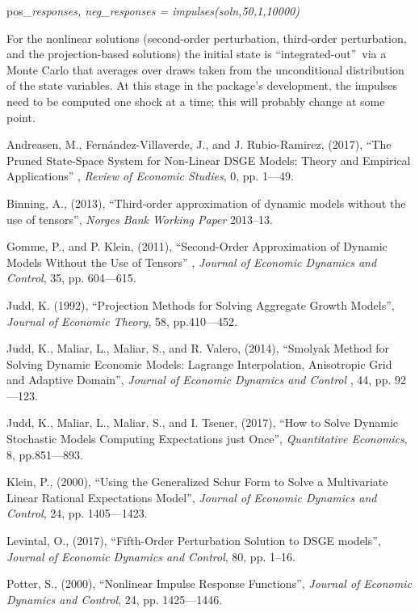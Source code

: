 \documentclass[notitlepage,11pt]{article}
\begin{document}
pos\_\textit{responses, neg\_responses = impulses(soln,50,1,10000)}

\bigskip

For the nonlinear solutions (second-order perturbation, third-order
perturbation, and the projection-based solutions) the initial state is
\textquotedblleft integrated-out\textquotedblright\ via a Monte Carlo that
averages over draws taken from the unconditional distribution of the state
variables. At this stage in the package's development, the impulses need to
be computed one shock at a time; this will probably change at some point.

\begin{thebibliography}{9}
\bibitem{} Andreasen, M., Fern\'{a}ndez-Villaverde, J., and J.
Rubio-Ramirez, (2017), \textquotedblleft The Pruned State-Space System for
Non-Linear DSGE Models: Theory and Empirical Applications\textquotedblright
, \textit{Review of Economic Studies}, 0, pp. 1---49.

\bibitem{} Binning, A., (2013), \textquotedblleft Third-order approximation
of dynamic models without the use of tensors\textquotedblright , \textit{%
Norges Bank Working Paper} 2013--13.

\bibitem{} Gomme, P., and P. Klein, (2011), \textquotedblleft Second-Order
Approximation of Dynamic Models Without the Use of Tensors\textquotedblright
, \textit{Journal of Economic Dynamics and Control}, 35, pp. 604---615.

\bibitem{} Judd, K. (1992), \textquotedblleft Projection Methods for Solving
Aggregate Growth Models\textquotedblright , \textit{Journal of Economic
Theory}, 58, pp.410---452.

\bibitem{} Judd, K., Maliar, L., Maliar, S., and R. Valero, (2014),
\textquotedblleft Smolyak Method for Solving Dynamic Economic Models:
Lagrange Interpolation, Anisotropic Grid and Adaptive
Domain\textquotedblright , \textit{Journal of Economic Dynamics and Control}%
, 44, pp. 92---123.

\bibitem{} Judd, K., Maliar, L., Maliar, S., and I. Tsener, (2017),
\textquotedblleft How to Solve Dynamic Stochastic Models Computing
Expectations just Once\textquotedblright , \textit{Quantitative Economics},
8, pp.851---893.

\bibitem{} Klein, P., (2000), \textquotedblleft Using the Generalized Schur
Form to Solve a Multivariate Linear Rational Expectations
Model\textquotedblright , \textit{Journal of Economic Dynamics and Control},
24, pp. 1405---1423.

\bibitem{} Levintal, O., (2017), \textquotedblleft Fifth-Order Perturbation
Solution to DSGE models\textquotedblright , \textit{Journal of Economic
Dynamics and Control}, 80, pp. 1--16.

\bibitem{} Potter, S., (2000), \textquotedblleft Nonlinear Impulse Response
Functions\textquotedblright , \textit{Journal of Economic Dynamics and
Control}, 24, pp. 1425---1446.
\end{thebibliography}
\end{document}
